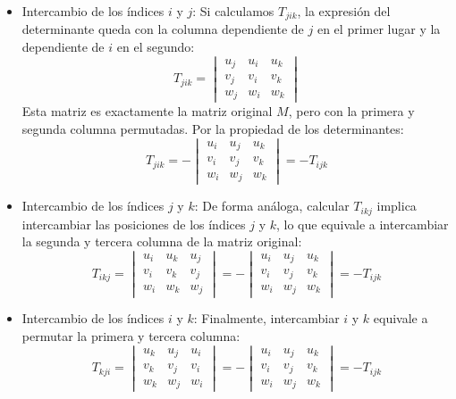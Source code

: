 \documentclass[11pt,spanish]{article}
\begin{document}
\begin{itemize}
\item Intercambio de los índices $i$ y $j$:
Si calculamos $T_{jik}$, la expresión del determinante queda con la columna dependiente de $j$ en el primer lugar y la dependiente de $i$ en el segundo:
$$T_{jik} = \begin{vmatrix} 
u_j & u_i & u_k \\ 
v_j & v_i & v_k \\ 
w_j & w_i & w_k 
\end{vmatrix}$$
Esta matriz es exactamente la matriz original $M$, pero con la primera y segunda columna permutadas. Por la propiedad de los determinantes:
$$T_{jik} = - \begin{vmatrix} 
u_i & u_j & u_k \\ 
v_i & v_j & v_k \\ 
w_i & w_j & w_k 
\end{vmatrix} = -T_{ijk}$$

\item Intercambio de los índices $j$ y $k$:
De forma análoga, calcular $T_{ikj}$ implica intercambiar las posiciones de los índices $j$ y $k$, lo que equivale a intercambiar la segunda y tercera columna de la matriz original:
$$T_{ikj} = \begin{vmatrix} 
u_i & u_k & u_j \\ 
v_i & v_k & v_j \\ 
w_i & w_k & w_j 
\end{vmatrix} = - \begin{vmatrix} 
u_i & u_j & u_k \\ 
v_i & v_j & v_k \\ 
w_i & w_j & w_k 
\end{vmatrix} = -T_{ijk}$$

\item Intercambio de los índices $i$ y $k$:
Finalmente, intercambiar $i$ y $k$ equivale a permutar la primera y tercera columna:
$$T_{kji} = \begin{vmatrix} 
u_k & u_j & u_i \\ 
v_k & v_j & v_i \\ 
w_k & w_j & w_i 
\end{vmatrix} = - \begin{vmatrix} 
u_i & u_j & u_k \\ 
v_i & v_j & v_k \\ 
w_i & w_j & w_k 
\end{vmatrix} = -T_{ijk}$$

\end{itemize}
\end{document}
